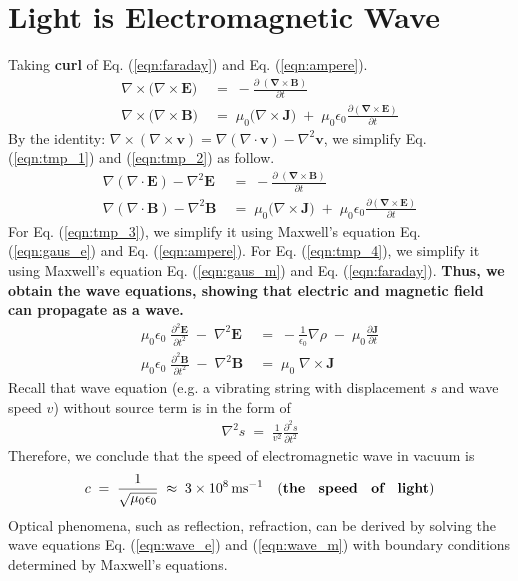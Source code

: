 \documentclass[12pt,a4paper]{article}
\begin{document}
\section{Light is Electromagnetic Wave}
Taking \textbf{curl} of Eq. (\ref{eqn:faraday}) and Eq. (\ref{eqn:ampere}).
\begin{align}
	\nabla \times \Big( \nabla \times \mathbf{E} \Big)  \; &= \; -\frac{\partial \; ( \mathbf{ \nabla \times B}) }{\partial t} \label{eqn:tmp_1}\\
	\nabla \times \Big( \nabla \times \mathbf{B} \Big) \; &= \; \mu_{0}  \Big(\nabla \times \mathbf{J}\Big) \; + \; \mu_{0} \epsilon_{0} \frac{\partial \mathbf{( \nabla \times E )}}{\partial t} \label{eqn:tmp_2}
\end{align}
By the identity: $\nabla \times (\nabla \times \mathbf{v}) = \nabla (\nabla \cdot \mathbf{v}) - \nabla^{2} \mathbf{v}$, we simplify Eq. (\ref{eqn:tmp_1}) and (\ref{eqn:tmp_2}) as follow.
\begin{align}
	 \nabla (\nabla \cdot \mathbf{E}) - \nabla^{2} \mathbf{E} \; &= \; -\frac{\partial \; ( \mathbf{ \nabla \times B}) }{\partial t} \label{eqn:tmp_3} \\
	  \nabla (\nabla \cdot \mathbf{B}) - \nabla^{2} \mathbf{B} \; &= \; \mu_{0}  \Big(\nabla \times \mathbf{J}\Big) \; + \; \mu_{0} \epsilon_{0} \frac{\partial \mathbf{( \nabla \times E )}}{\partial t} \label{eqn:tmp_4}
\end{align}
For Eq. (\ref{eqn:tmp_3}), we simplify it using Maxwell's equation Eq. (\ref{eqn:gaus_e}) and Eq. (\ref{eqn:ampere}).
For Eq. (\ref{eqn:tmp_4}), we simplify it using Maxwell's equation Eq. (\ref{eqn:gaus_m}) and Eq. (\ref{eqn:faraday}). \textbf{Thus, we obtain the wave equations, showing that electric and magnetic field can propagate as a wave.}
\begin{align}
	\mu_{0} \epsilon_{0} \; \frac{\partial^{2} \mathbf{E}}{\partial t^{2}} \; - \; \nabla^{2} \mathbf{E} \; &= \; -\frac{1}{\epsilon_{0}} \nabla \rho \; - \; \mu_{0} \frac{\partial \mathbf{J}}{\partial t} \label{eqn:wave_e}\\
	\mu_{0} \epsilon_{0} \; \frac{\partial^{2} \mathbf{B}}{\partial t^{2}} \; - \; \nabla^{2} \mathbf{B} \; &= \; \mu_{0} \; \nabla \times \mathbf{J} \label{eqn:wave_m}
\end{align}
Recall that wave equation (e.g. a vibrating string with displacement $s$ and wave speed $v$) without source term is in the form of
\begin{align}
	\nabla^{2} s \; = \; \frac{1}{v^{2}} \frac{\partial^{2} s}{\partial t^{2}}
\end{align}
Therefore, we conclude that the speed of electromagnetic wave in vacuum is
\begin{align}
	c \; = \; \frac{1}{\sqrt{\mu_{0} \epsilon_{0}}} \; \approx \; 3 \times 10^{8} \, \mathrm{m s}^{-1} \quad (\mathrm{\textbf{the \, speed \, of \, light}})
\end{align}
Optical phenomena, such as reflection, refraction, can be derived by solving the wave equations Eq. (\ref{eqn:wave_e}) and (\ref{eqn:wave_m}) with boundary conditions determined by Maxwell's equations.
\end{document}
